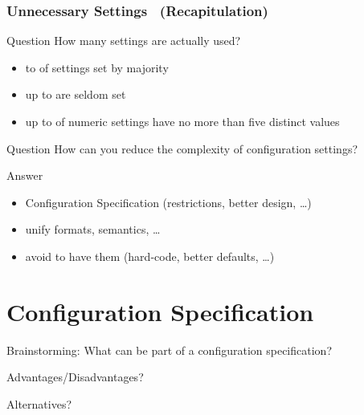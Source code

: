 \begin{frame}
	\frametitle{Unnecessary Settings~\cite{xu2015hey} (Recapitulation)}

	\begin{alertblock}{Question}
	How many settings are actually used?
	\end{alertblock}

	\pause

	\begin{itemize}
	\item {} to  of settings set by majority
	\item up to  are seldom set
	\item up to  of numeric settings have no more than five distinct values
	\end{itemize}
\end{frame}

\begin{frame}
	\begin{alertblock}{Question}
	How can you reduce the complexity of configuration settings?
	\end{alertblock}

	\pause
	\begin{exampleblock}{Answer}
	\begin{itemize}
	\item Configuration Specification (restrictions, better design, \dots)
	\item unify formats, semantics, \dots
	\item avoid to have them (hard-code, better defaults, \dots)
	\end{itemize}
	\end{exampleblock}
\end{frame}




\section{Configuration Specification}

\begin{assignment}
	\begin{task}
	Brainstorming: What can be part of a configuration specification?
	\end{task}

	\begin{task}
	Advantages/Disadvantages?
	\end{task}

	\begin{task}
	Alternatives?
	\end{task}
\end{assignment}

